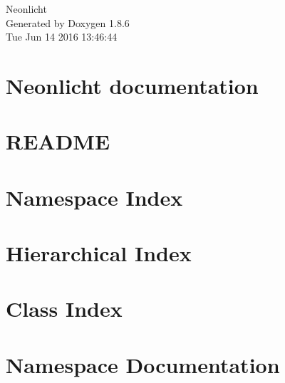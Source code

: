 \documentclass[twoside]{book}
\newcommand{\clearemptydoublepage}{%
  \newpage{\pagestyle{empty}\cleardoublepage}%
}
\begin{document}
\hypersetup{pageanchor=false}
\begin{titlepage}
\vspace*{7cm}
\begin{center}%
{\Large Neonlicht }\\
\vspace*{1cm}
{\large Generated by Doxygen 1.8.6}\\
\vspace*{0.5cm}
{\small Tue Jun 14 2016 13:46:44}\\
\end{center}
\end{titlepage}
\clearemptydoublepage
\tableofcontents
\clearemptydoublepage
{}
\hypersetup{pageanchor=true}

\chapter{Neonlicht documentation}
\label{index}\hypertarget{index}{}
\chapter{R\-E\-A\-D\-M\-E}
\label{md_README}
\hypertarget{md_README}{}

\chapter{Namespace Index}

\chapter{Hierarchical Index}

\chapter{Class Index}

\chapter{Namespace Documentation}

\end{document}
